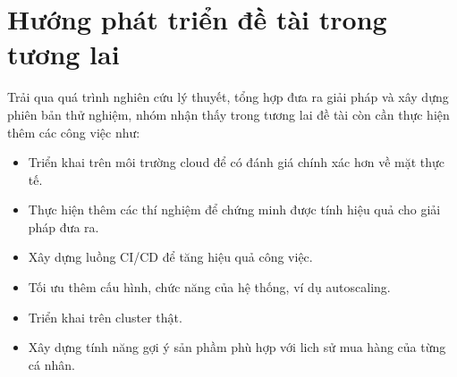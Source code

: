 \section{Hướng phát triển đề tài trong tương lai}
\noindent Trải qua quá trình nghiên cứu lý thuyết, tổng hợp đưa ra giải pháp và xây dựng phiên bản thử nghiệm, nhóm nhận thấy trong tương lai đề tài còn cần thực hiện thêm các công việc như:
\begin{itemize}
    \item Triển khai trên môi trường cloud để có đánh giá chính xác hơn về mặt thực tế.
    \item Thực hiện thêm các thí nghiệm để chứng minh được tính hiệu quả cho giải pháp đưa ra.
    \item Xây dựng luồng CI/CD để tăng hiệu quả công việc.
    \item Tối ưu thêm cấu hình, chức năng của hệ thống, ví dụ autoscaling.
    \item Triển khai trên cluster thật.
    \item Xây dựng tính năng gợi ý sản phầm phù hợp với lich sử mua hàng của từng cá nhân.
\end{itemize}
